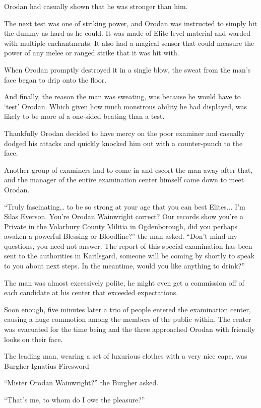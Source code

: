 \documentclass[a4paper,10pt]{book}
\begin{document}
Orodan had casually shown that he was stronger than him.\par
The next test was one of striking power, and Orodan was instructed to simply hit the dummy as hard as he could. It was made of Elite-level material and warded with multiple enchantments. It also had a magical sensor that could measure the power of any melee or ranged strike that it was hit with.\par
When Orodan promptly destroyed it in a single blow, the sweat from the man’s face began to drip onto the floor.\par
And finally, the reason the man was sweating, was because he would have to ‘test’ Orodan. Which given how much monstrous ability he had displayed, was likely to be more of a one-sided beating than a test.\par
Thankfully Orodan decided to have mercy on the poor examiner and casually dodged his attacks and quickly knocked him out with a counter-punch to the face.\par
Another group of examiners had to come in and escort the man away after that, and the manager of the entire examination center himself came down to meet Orodan.\par
“Truly fascinating… to be so strong at your age that you can best Elites... I’m Silas Everson. You’re Orodan Wainwright correct? Our records show you’re a Private in the Volarbury County Militia in Ogdenborough, did you perhaps awaken a powerful Blessing or Bloodline?” the man asked. “Don’t mind my questions, you need not answer. The report of this special examination has been sent to the authorities in Karilsgard, someone will be coming by shortly to speak to you about next steps. In the meantime, would you like anything to drink?”\par
The man was almost excessively polite, he might even get a commission off of each candidate at his center that exceeded expectations.\par
Soon enough, five minutes later a trio of people entered the examination center, causing a huge commotion among the members of the public within. The center was evacuated for the time being and the three approached Orodan with friendly looks on their face.\par
The leading man, wearing a set of luxurious clothes with a very nice cape, was Burgher Ignatius Firesword\par
“Mister Orodan Wainwright?” the Burgher asked.\par
“That’s me, to whom do I owe the pleasure?”\par
\end{document}
